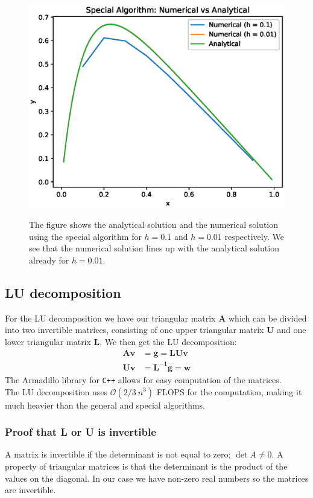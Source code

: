 \documentclass[american,a4paper,12pt]{article}
\renewcommand{\vec}[1]{\mathbf{#1}} %
\begin{document}
\begin{figure}[H]
\begin{center}
  \includegraphics[width = \textwidth]{figures/special_algo_example.eps} \\
  \caption{The figure shows the analytical solution and the numerical solution using the special algorithm for $h = 0.1$ and $h = 0.01$ respectively. We see that the numerical solution lines up with the analytical solution already for $h = 0.01$.}
  \label{fig:special_ex}
  \end{center}
\end{figure}
\subsection{LU decomposition}
For the LU decomposition we have our triangular matrix $\vec{A}$ which can be divided into two invertible matrices, consisting of one upper triangular matrix $\vec{U}$ and one lower triangular matrix $\vec{L}$. We then get the LU decomposition:
\begin{align*}
    \vec{Av} &= \vec{g} = \vec{LUv}\\
    \vec{Uv} &= \vec{L^{-1}g = \vec{w}}
\end{align*}
The Armadillo \cite{Armadillo} library for \verb!C++! allows for easy computation of the matrices.\\
The LU decomposition uses $\mathcal{O}(2/3\ n^3)$ FLOPS for the computation, making it much heavier than the general and special algorithms.

\subsubsection*{Proof that L or U is invertible}
A matrix is invertible if the determinant is not equal to zero; $\det A \neq 0$. A property of triangular matrices is that the determinant is the product of the values on the diagonal. In our case we have non-zero real numbers so the matrices are invertible.
\end{document}
